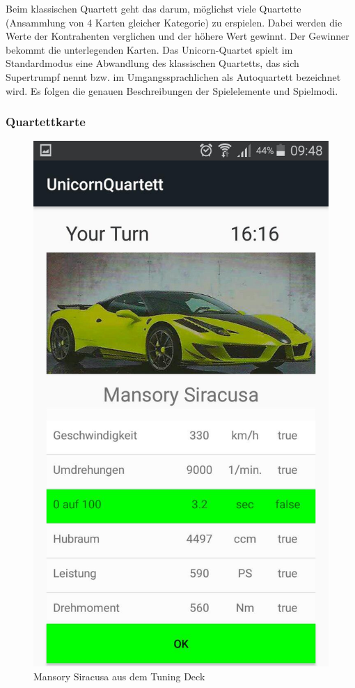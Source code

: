\documentclass{scrartcl}
\begin{document}
Beim klassischen Quartett geht das darum, möglichst viele Quartette (Ansammlung von 4 Karten gleicher Kategorie) zu erspielen.
Dabei werden die Werte der Kontrahenten verglichen und der höhere Wert gewinnt. Der Gewinner bekommt die unterlegenden Karten.
Das Unicorn-Quartet spielt im Standardmodus eine Abwandlung des klassischen Quartetts, das sich Supertrumpf nennt bzw. im Umgangssprachlichen als
Autoquartett  bezeichnet wird. Es folgen die genauen Beschreibungen der Spielelemente und Spielmodi.
\subsubsection{Quartettkarte}

\begin{figure}[!ht]
\begin{center}
    \includegraphics[scale=0.3]{pics/gameplay.jpg}
    \caption{Mansory Siracusa aus dem Tuning Deck}
\end{center}
\end{figure}
\end{document}
